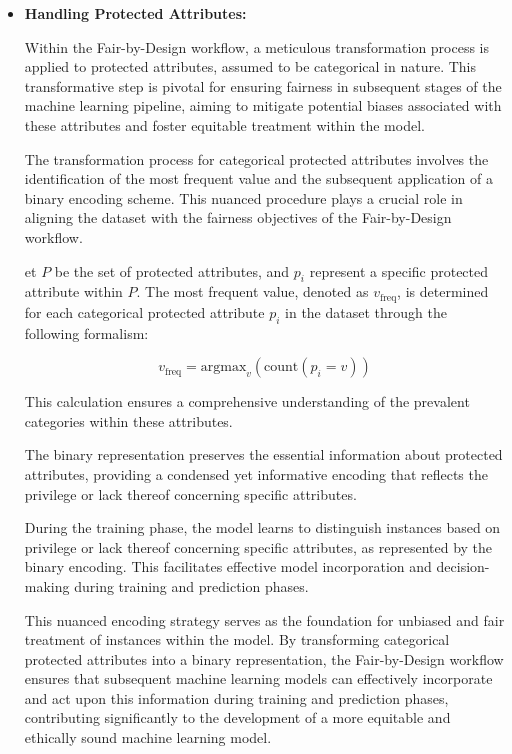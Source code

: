 \begin{itemize}
    
    \item \textbf{Handling Protected Attributes:} 
    
    Within the Fair-by-Design workflow, a meticulous transformation process is applied to protected attributes, assumed to be categorical in nature. This transformative step is pivotal for ensuring fairness in subsequent stages of the machine learning pipeline, aiming to mitigate potential biases associated with these attributes and foster equitable treatment within the model.

    The transformation process for categorical protected attributes involves the identification of the most frequent value and the subsequent application of a binary encoding scheme. This nuanced procedure plays a crucial role in aligning the dataset with the fairness objectives of the Fair-by-Design workflow.

    et $P$ be the set of protected attributes, and $p_i$ represent a specific protected attribute within $P$. The most frequent value, denoted as $v_{\text{freq}}$, is determined for each categorical protected attribute $p_i$ in the dataset through the following formalism:

    \[
    v_{\text{freq}} = \text{argmax}_v \left( \text{count}(p_i = v) \right)
    \]
    
    This calculation ensures a comprehensive understanding of the prevalent categories within these attributes.

    The binary representation preserves the essential information about protected attributes, providing a condensed yet informative encoding that reflects the privilege or lack thereof concerning specific attributes.

    During the training phase, the model learns to distinguish instances based on privilege or lack thereof concerning specific attributes, as represented by the binary encoding. This facilitates effective model incorporation and decision-making during training and prediction phases.

    This nuanced encoding strategy serves as the foundation for unbiased and fair treatment of instances within the model. By transforming categorical protected attributes into a binary representation, the Fair-by-Design workflow ensures that subsequent machine learning models can effectively incorporate and act upon this information during training and prediction phases, contributing significantly to the development of a more equitable and ethically sound machine learning model.


\end{itemize}
